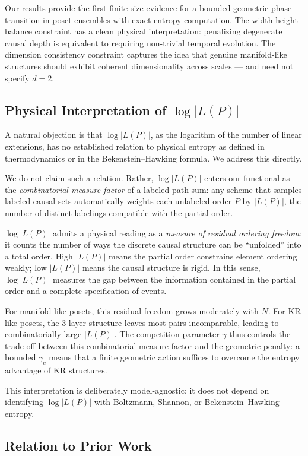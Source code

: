 \documentclass[entropy,article,submit,pdftex,moreauthors]{Definitions/mdpi}
\begin{document}
Our results provide the first finite-size evidence for a bounded geometric phase transition in poset ensembles with exact entropy computation. The width-height balance constraint has a clean physical interpretation: penalizing degenerate causal depth is equivalent to requiring non-trivial temporal evolution. The dimension consistency constraint captures the idea that genuine manifold-like structures should exhibit coherent dimensionality across scales --- and need not specify $d = 2$.

\subsection{Physical Interpretation of $\log|L(P)|$}

A natural objection is that $\log|L(P)|$, as the logarithm of the number of
linear extensions, has no established relation to physical entropy as defined in
thermodynamics or in the Bekenstein--Hawking formula. We address this directly.

We do not claim such a relation. Rather, $\log|L(P)|$ enters our functional as
the \emph{combinatorial measure factor} of a labeled path sum: any scheme that
samples labeled causal sets automatically weights each unlabeled order $P$ by
$|L(P)|$, the number of distinct labelings compatible with the partial order.

$\log|L(P)|$ admits a physical reading as a \emph{measure of residual ordering
freedom}: it counts the number of ways the discrete causal structure can be
``unfolded'' into a total order. High $|L(P)|$ means the partial order
constrains element ordering weakly; low $|L(P)|$ means the causal structure is
rigid. In this sense, $\log|L(P)|$ measures the gap between the information
contained in the partial order and a complete specification of events.

For manifold-like posets, this residual freedom grows moderately with $N$. For
KR-like posets, the 3-layer structure leaves most pairs incomparable, leading to
combinatorially large $|L(P)|$. The competition parameter $\gamma$ thus
controls the trade-off between this combinatorial measure factor and the
geometric penalty: a bounded $\gamma_c$ means that a finite geometric action
suffices to overcome the entropy advantage of KR structures.

This interpretation is deliberately model-agnostic: it does not depend on
identifying $\log|L(P)|$ with Boltzmann, Shannon, or Bekenstein--Hawking
entropy.

\subsection{Relation to Prior Work}
\end{document}
